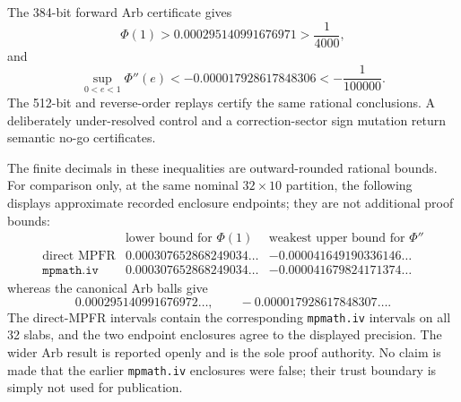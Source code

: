 \documentclass[11pt]{article}
\numberwithin{equation}{section}
\theoremstyle{remark}
\begin{document}
The 384-bit forward Arb certificate gives
\[
  \Phi(1)>
  0.000295140991676971
  >\frac1{4000},
\]
and
\[
  \sup_{0<e<1}\Phi''(e)
  <-0.000017928617848306
  <-\frac1{100000}.
\]
The 512-bit and reverse-order replays certify the same rational conclusions.  A deliberately under-resolved control and a correction-sector sign mutation return semantic no-go certificates.

The finite decimals in these inequalities are outward-rounded rational
bounds. For comparison only, at the same nominal $32\times10$ partition,
the following displays approximate recorded enclosure endpoints; they are
not additional proof bounds:
\[
\begin{array}{c|cc}
 & \text{lower bound for }\Phi(1) & \text{weakest upper bound for }\Phi'' \\
\hline
\text{direct MPFR} & 0.000307652868249034\ldots & -0.000041649190336146\ldots \\
\texttt{mpmath.iv} & 0.000307652868249034\ldots & -0.000041679824171374\ldots
\end{array}
\]
whereas the canonical Arb balls give
\[
  0.000295140991676972\ldots,
  \qquad
  -0.000017928617848307\ldots .
\]
The direct-MPFR intervals contain the corresponding \texttt{mpmath.iv} intervals on all 32 slabs, and the two endpoint enclosures agree to the displayed precision.  The wider Arb result is reported openly and is the sole proof authority.  No claim is made that the earlier \texttt{mpmath.iv} enclosures were false; their trust boundary is simply not used for publication.


\end{document}
